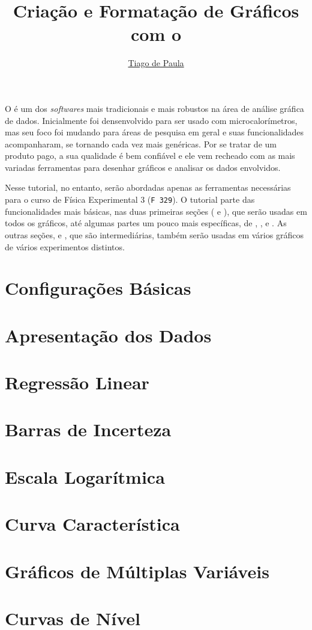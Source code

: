 \documentclass{article}
\title{Criação e Formatação de Gráficos com o}\softwarelogo
\author{\hyperref{mailto:t187679@dac.unicamp.br}{}{}{Tiago de Paula}}
\date{}
\begin{document}
    \maketitle

    O \software é um dos \textit{softwares} mais tradicionais e mais robustos na área de análise gráfica de dados. Inicialmente foi densenvolvido para ser usado com microcalorímetros, mas seu foco foi mudando para áreas de pesquisa em geral e suas funcionalidades acompanharam, se tornando cada vez mais genéricas. Por se tratar de um produto pago, a sua qualidade é bem confiável e ele vem recheado com as mais variadas ferramentas para desenhar gráficos e analisar os dados envolvidos.

    Nesse tutorial, no entanto, serão abordadas apenas as ferramentas necessárias para o curso de Física Experimental 3 (\texttt{F 329}). O tutorial parte das funcionalidades mais básicas, nas duas primeiras seções ( e ), que serão usadas em todos os gráficos, até algumas partes um pouco mais específicas, de , ,  e . As outras seções,  e , que são intermediárias, também serão usadas em vários gráficos de vários experimentos distintos.

    \section{Configurações Básicas} \label{sec:basico}
        

    \section{Apresentação dos Dados} \label{sec:reta}
        

    \section{Regressão Linear} \label{sec:regres}
        

    \section{Barras de Incerteza} \label{sec:incert}
        

    \section{Escala Logarítmica} \label{sec:escala}
        

    \section{Curva Característica} \label{sec:caract}
        

    \section{Gráficos de Múltiplas Variáveis} \label{sec:multiv}
        

    \section{Curvas de Nível} \label{sec:contorno}
        
\end{document}
